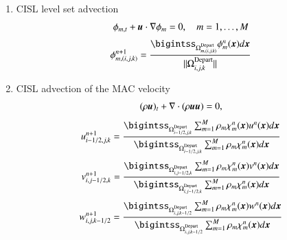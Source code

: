 \documentclass[preprint,12pt]{Definitions/elsarticle}
\newcommand{\tn}{\textnormal}
\newcommand{\bmu}{\mbox{\boldmath $u$\unboldmath}}
\newcommand{\bmx}{\mbox{\boldmath $x$\unboldmath}}
\begin{document}
\begin{enumerate}
	\item CISL level set advection
	\begin{equation}
	\phi_{m,t}+\bmu\cdot\nabla\phi_{m}=0, \hspace{10pt} 
	m=1,\ldots,M 
	\end{equation}
	\begin{equation}
	\phi_{m,(i,j,k)}^{n+1}=
	\frac{\bigintss_{\Omega_{m,(i,j,k)}^\tn{Depart}} \phi_m^{n}(\bmx) d\bmx}
	{||\Omega_{i,j,k}^\tn{Depart}||}
	\end{equation}
	\item CISL advection of the MAC velocity 
	\begin{equation}
	(\rho \bmu)_{t}+\nabla\cdot(\rho\bmu\bmu)=0, \label{advection}
	\end{equation}
	\begin{equation}
	u_{i-1/2,j,k}^{n+1}=
	\frac{\bigintss_{\Omega_{i-1/2,j,k}^\tn{Depart}}
		\sum_{m=1}^{M} \rho_{m}\chi_m^{n}(\bmx)u^{n}(\bmx) d\bmx}
	{\bigintss_{\Omega_{i-1/2,j,k}^\tn{Depart}}
		\sum_{m=1}^{M} \rho_{m}\chi_m^{n}(\bmx) d\bmx}
	\end{equation}
	\begin{equation}
	v_{i,j-1/2,k}^{n+1}=
	\frac{\bigintss_{\Omega_{i,j-1/2,k}^\tn{Depart}}
		\sum_{m=1}^{M} \rho_{m}\chi_m^{n}(\bmx)v^{n}(\bmx) d\bmx}
	{\bigintss_{\Omega_{i,j-1/2,k}^\tn{Depart}}
		\sum_{m=1}^{M} \rho_{m}\chi_m^{n}(\bmx) d\bmx}
	\end{equation}
	\begin{equation}
	w_{i,j,k-1/2}^{n+1}=
	\frac{\bigintss_{\Omega_{i,j,k-1/2}^\tn{Depart}}
		\sum_{m=1}^{M} \rho_{m}\chi_m^{n}(\bmx)w^{n}(\bmx) d\bmx}
	{\bigintss_{\Omega_{i,j,k-1/2}^\tn{Depart}}
		\sum_{m=1}^{M} \rho_{m}\chi_m^{n}(\bmx) d\bmx}
	\end{equation}
	

\end{enumerate}
\end{document}
